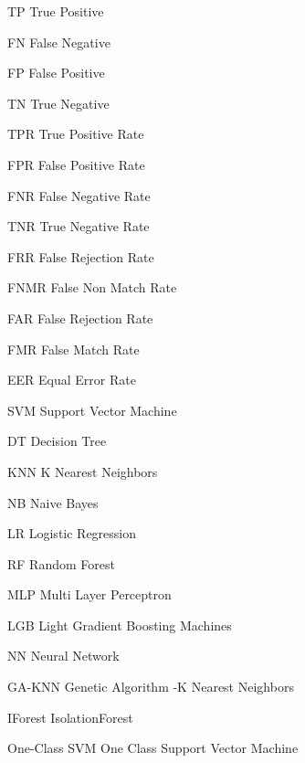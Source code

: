 \documentclass{article}
\begin{document}
% 
\begin{abbrv}
\item[TP] True Positive
\item[FN] False Negative
\item[FP] False Positive
\item[TN] True Negative
\item[TPR] True Positive Rate
\item[FPR] False Positive Rate
\item[FNR] False Negative Rate
\item[TNR] True Negative Rate
\item[FRR] False Rejection Rate
\item[FNMR] False Non Match Rate
\item[FAR] False Rejection Rate
\item[FMR] False Match Rate
\item[EER] Equal Error Rate
\item[SVM] Support Vector Machine
\item[DT] Decision Tree
\item[KNN] K Nearest Neighbors
\item[NB] Naive Bayes
\item[LR] Logistic Regression
\item[RF] Random Forest
\item[MLP] Multi Layer Perceptron
\item[LGB] Light Gradient Boosting Machines
\item[NN] Neural Network
\item[GA-KNN] Genetic Algorithm -K Nearest Neighbors
\item[IForest] IsolationForest
\item[One-Class SVM] One Class Support Vector Machine 
\end{abbrv}




\end{document}
